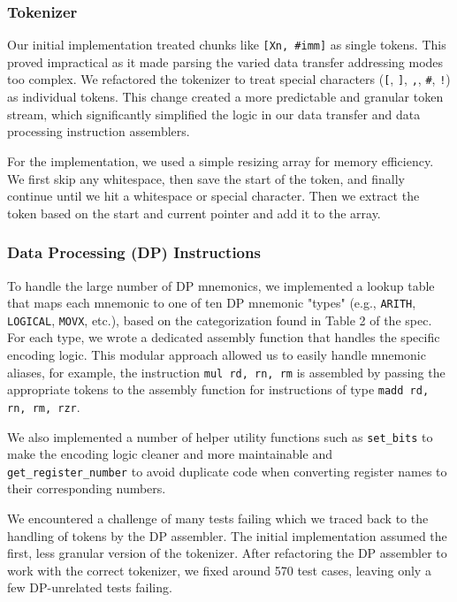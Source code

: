 \documentclass[11pt]{article}
\begin{document}
\subsubsection{Tokenizer}
Our initial implementation treated chunks like \texttt{[Xn, \#imm]} as single tokens. 
This proved impractical as it made parsing the varied data transfer addressing modes too complex. 
We refactored the tokenizer to treat special characters (\texttt{[}, \texttt{]}, \texttt{,}, \texttt{\#}, \texttt{!}) as individual tokens. 
This change created a more predictable and granular token stream,
which significantly simplified the logic in our data transfer and data processing instruction assemblers.

For the implementation, we used a simple resizing array for memory efficiency.
We first skip any whitespace, then save the start of the token, and finally continue until we hit a whitespace or special character.
Then we extract the token based on the start and current pointer and add it to the array.

\subsubsection{Data Processing (DP) Instructions}
To handle the large number of DP mnemonics, we implemented a lookup table that maps each mnemonic to one of ten DP mnemonic "types" 
(e.g., \texttt{ARITH}, \texttt{LOGICAL}, \texttt{MOVX}, etc.), based on the categorization found in Table 2 of the spec.
For each type, we wrote a dedicated assembly function that handles the specific encoding logic. 
This modular approach allowed us to easily handle mnemonic aliases, for example, the instruction \texttt{mul rd, rn, rm} is 
assembled by passing the appropriate tokens to the assembly function for instructions of type \texttt{madd rd, rn, rm, rzr}.

We also implemented a number of helper utility functions such as \texttt{set\_bits} to make the encoding logic cleaner and more maintainable
and \texttt{get\_register\_number} to avoid duplicate code when converting register names to their corresponding numbers.

We encountered a challenge of many tests failing which we traced back to the handling of tokens by the DP assembler. 
The initial implementation assumed the first, less granular version of the tokenizer.
After refactoring the DP assembler to work with the correct tokenizer, we fixed around 570 test cases, leaving only a few DP-unrelated tests failing.
\end{document}
